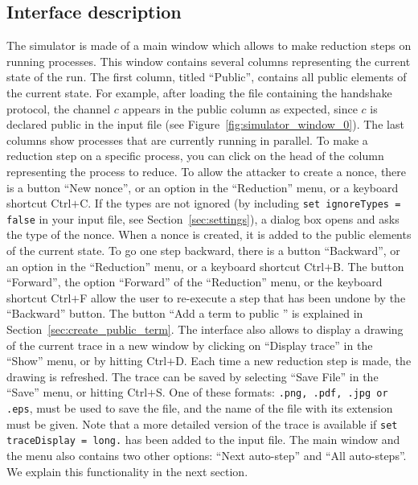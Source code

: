 \documentclass{book}
\begin{document}

\subsection{Interface description}\label{sec:interact_interface_desc}
The simulator is made of a main window which allows to make reduction steps on running processes. This window contains several columns representing the current state of the run. The first column, titled ``Public'', contains all public elements of the current state. For example, after loading the file containing the handshake protocol, the channel $c$ appears in the public column as expected, since $c$ is declared public in the input file (see Figure~\ref{fig:simulator_window_0}).  The last columns show processes that are currently running in parallel. To make a reduction step on a specific process, you can click on the head of the column representing the process to reduce. To allow the attacker to create a nonce, there is a button ``New nonce'', or an option in the ``Reduction'' menu, or a keyboard shortcut Ctrl$+$C. If the types are not ignored (by including \lstinline!set ignoreTypes = false! in your input file, see Section~\ref{sec:settings}), a dialog box opens and asks the type of the nonce. When a nonce is created, it is added to the public elements of the current state. To go one step backward, there is a button ``Backward'', or an option in the ``Reduction'' menu, or a keyboard shortcut Ctrl$+$B. The button ``Forward'', the option ``Forward'' of the ``Reduction'' menu, or the keyboard shortcut Ctrl$+$F allow the user to re-execute a step that has been undone by the ``Backward'' button. The button ``Add a term to public '' is explained in Section~\ref{sec:create_public_term}. The interface also allows to display a drawing of the current trace in a new window by clicking on ``Display trace'' in the ``Show'' menu, or by hitting  Ctrl$+$D. Each time a new reduction step is made, the drawing is refreshed. The trace can be saved by selecting ``Save File'' in the  ``Save'' menu, or hitting Ctrl$+$S. One of these formats: \texttt{.png, .pdf, .jpg or .eps}, must be used to save the file, and the name of the file with its extension must be given. Note that a more detailed version of the trace is available if \lstinline!set traceDisplay = long.! has been added to the input file. The main window and the menu also contains two other options: ``Next auto-step'' and ``All auto-steps''. We explain this functionality in the next section.
\end{document}
